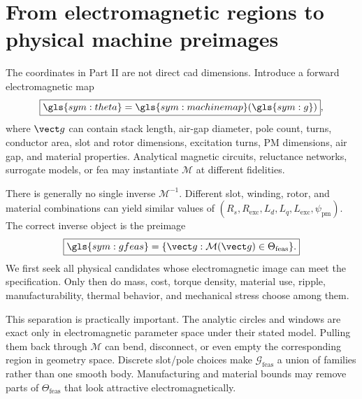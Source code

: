 \section{From electromagnetic regions to physical machine preimages}
\label{sec:geometry-preimage}

The coordinates in Part II are not direct \gls{cad} dimensions.  Introduce a
forward electromagnetic map
\begin{equation}
 \boxed{\gls{sym:theta}=\gls{sym:machinemap}(\gls{sym:g})},
 \label{eq:geometry-forward-map}
\end{equation}
where \(\vect g\) can contain stack length, air-gap diameter, pole count,
turns, conductor area, slot and rotor dimensions, excitation turns, PM
dimensions, air gap, and material properties.  Analytical magnetic circuits,
reluctance networks, surrogate models, or \gls{fea} may instantiate
\(\mathcal M\) at different fidelities.

There is generally no single inverse \(\mathcal M^{-1}\).  Different slot,
winding, rotor, and material combinations can yield similar values of
\((R_s,R_{\mathrm{exc}},L_d,L_q,L_{\mathrm{exc}},\psi_{\mathrm{pm}})\).
The correct inverse object is the preimage
\begin{equation}
 \boxed{\gls{sym:gfeas}=
 \{\vect g:\mathcal M(\vect g)\in\Theta_{\mathrm{feas}}\}.}
 \label{eq:geometry-feasible-preimage}
\end{equation}
We first seek all physical candidates whose electromagnetic image can meet
the specification.  Only then do mass, cost, torque density, material use,
ripple, manufacturability, thermal behavior, and mechanical stress choose
among them.



This separation is practically important.  The analytic circles and windows
are exact only in electromagnetic parameter space under their stated model.
Pulling them back through \(\mathcal M\) can bend, disconnect, or even empty
the corresponding region in geometry space.  Discrete slot/pole choices make
\(\mathcal G_{\mathrm{feas}}\) a union of families rather than one smooth
body.  Manufacturing and material bounds may remove parts of
\(\Theta_{\mathrm{feas}}\) that look attractive electromagnetically.

